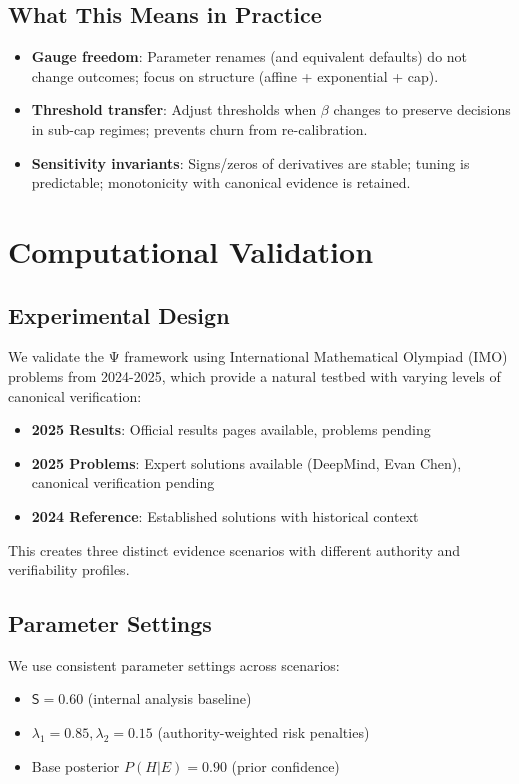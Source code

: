 \documentclass[12pt,a4paper]{article}
\newcommand{\Ssig}{\mathsf{S}}
\newcommand{\lA}{\lambda_1}
\newcommand{\lV}{\lambda_2}
\begin{document}
\subsection{What This Means in Practice}
\begin{itemize}[leftmargin=2em]
  \item \textbf{Gauge freedom}: Parameter renames (and equivalent defaults) do not change outcomes; focus on structure (affine + exponential + cap).
  \item \textbf{Threshold transfer}: Adjust thresholds when $\beta$ changes to preserve decisions in sub-cap regimes; prevents churn from re-calibration.
  \item \textbf{Sensitivity invariants}: Signs/zeros of derivatives are stable; tuning is predictable; monotonicity with canonical evidence is retained.
\end{itemize}

\section{Computational Validation}

\subsection{Experimental Design}

We validate the Ψ framework using International Mathematical Olympiad (IMO) problems from 2024-2025, which provide a natural testbed with varying levels of canonical verification:

\begin{itemize}
\item \textbf{2025 Results}: Official results pages available, problems pending
\item \textbf{2025 Problems}: Expert solutions available (DeepMind, Evan Chen), canonical verification pending  
\item \textbf{2024 Reference}: Established solutions with historical context
\end{itemize}

This creates three distinct evidence scenarios with different authority and verifiability profiles.

\subsection{Parameter Settings}

We use consistent parameter settings across scenarios:
\begin{itemize}
\item $\Ssig = 0.60$ (internal analysis baseline)
\item $\lA = 0.85, \lV = 0.15$ (authority-weighted risk penalties)
\item Base posterior $P(H|E) = 0.90$ (prior confidence)
\end{itemize}
\end{document}
